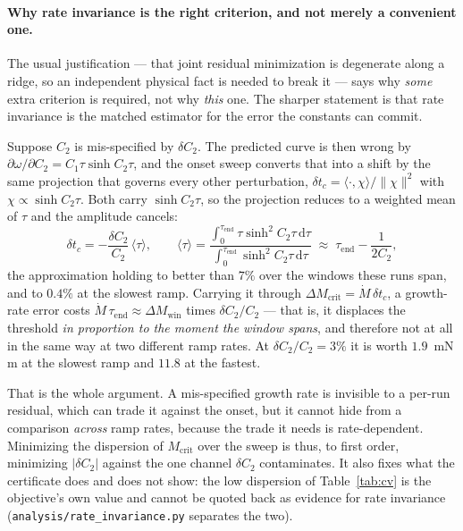\documentclass[10pt]{article}
\begin{document}
\paragraph{Why rate invariance is the right criterion, and not merely a
convenient one.}
The usual justification — that joint residual minimization is degenerate
along a ridge, so an independent physical fact is needed to break it —
says why \emph{some} extra criterion is required, not why \emph{this}
one. The sharper statement is that rate invariance is the matched
estimator for the error the constants can commit.

Suppose $C_2$ is mis-specified by $\delta C_2$. The predicted curve is
then wrong by $\partial\omega/\partial C_2 = C_1\tau\sinh C_2\tau$, and
the onset sweep converts that into a shift by the same projection that
governs every other perturbation,
$\delta t_c = \langle\cdot,\chi\rangle/\|\chi\|^2$ with
$\chi \propto \sinh C_2\tau$. Both carry $\sinh C_2\tau$, so the
projection reduces to a weighted mean of $\tau$ and the amplitude
cancels:
\begin{equation}
\delta t_c = -\frac{\delta C_2}{C_2}\,\langle\tau\rangle ,
\qquad
\langle\tau\rangle
= \frac{\int_0^{\tau_{\mathrm{end}}}\tau\sinh^2 C_2\tau\,\mathrm{d}\tau}
       {\int_0^{\tau_{\mathrm{end}}}\sinh^2 C_2\tau\,\mathrm{d}\tau}
\;\approx\; \tau_{\mathrm{end}} - \frac{1}{2C_2},
\label{eq:dc2}
\end{equation}
the approximation holding to better than $7\%$ over the windows these
runs span, and to $0.4\%$ at the slowest ramp. Carrying it through $\Delta M_{\mathrm{crit}} = \dot M\,\delta t_c$,
a growth-rate error costs
$\dot M\,\tau_{\mathrm{end}} \approx \Delta M_{\mathrm{win}}$ times
$\delta C_2/C_2$ — that is, it displaces the threshold \emph{in
proportion to the moment the window spans}, and therefore not at all in
the same way at two different ramp rates. At $\delta C_2/C_2 = 3\%$ it
is worth $1.9$~mN\,m at the slowest ramp and $11.8$ at the fastest.

That is the whole argument. A mis-specified growth rate is invisible to
a per-run residual, which can trade it against the onset, but it cannot
hide from a comparison \emph{across} ramp rates, because the trade it
needs is rate-dependent. Minimizing the dispersion of
$M_{\mathrm{crit}}$ over the sweep is thus, to first order, minimizing
$|\delta C_2|$ against the one channel $\delta C_2$ contaminates. It
also fixes what the certificate does and does not show: the low
dispersion of Table~\ref{tab:cv} is the objective's own value and cannot
be quoted back as evidence for rate invariance
(\texttt{analysis/rate\_invariance.py} separates the two).
\end{document}
